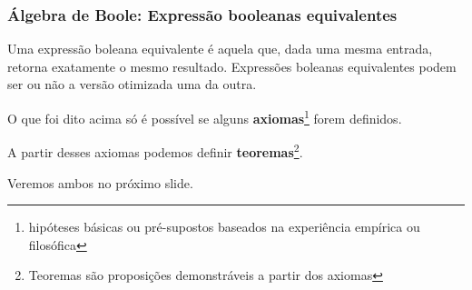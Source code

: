 \begin{frame}
	\frametitle{Álgebra de Boole: Expressão booleanas equivalentes}
	\par Uma expressão boleana equivalente é aquela que, dada uma mesma entrada, retorna exatamente o mesmo resultado. Expressões boleanas equivalentes podem ser ou não a versão otimizada uma da outra.\newline
	
	\par O que foi dito acima só é possível se alguns \textbf{axiomas}\footnote[frame]{hipóteses básicas ou pré-supostos baseados na experiência empírica ou filosófica} forem definidos. 
	\par A partir desses axiomas podemos definir \textbf{teoremas}\footnote[frame]{Teoremas são proposições demonstráveis a partir dos axiomas}.\newline
	\par Veremos ambos no próximo slide.
\end{frame}

